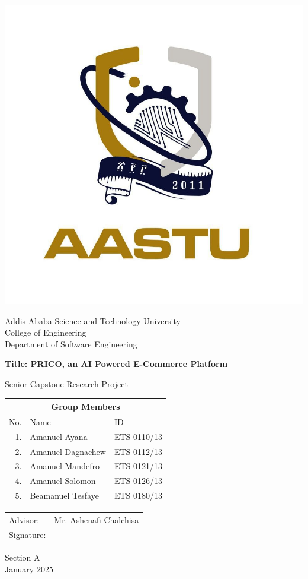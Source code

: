 \documentclass[12pt]{report}
\begin{document}
\begin{titlepage}
	\setlength{\parskip}{0pt}
	\singlespacing
	\begin{center}
		\includegraphics[width=0.4\linewidth]{aastu}

		\Large
		Addis Ababa Science and Technology University \\
		College of Engineering \\
		Department of Software Engineering

		\vspace*{1cm}

		\Large
		\textbf{Title: PRICO, an AI Powered E-Commerce Platform}

		\vspace{0.25cm}

		\Large
		Senior Capstone Research Project

		\vspace{1.25cm}

		\Large
		\begin{tabular}{ |r|l|l| }
			\hline
			\multicolumn{3}{|c|}{\textbf{Group Members}} \\
			\hline
			No. & Name              & ID                 \\
			\hline
			1.  & Amanuel Ayana     & ETS 0110/13        \\
			2.  & Amanuel Dagnachew & ETS 0112/13        \\
			3.  & Amanuel Mandefro  & ETS 0121/13        \\
			4.  & Amanuel Solomon   & ETS 0126/13        \\
			5.  & Beamanuel Tesfaye & ETS 0180/13        \\
			\hline
		\end{tabular}


		\vfill

		\Large
		\begin{tabular}{@{}p{1in}p{2.4in}@{}}
			Advisor:   & Mr. Ashenafi Chalchisa \\\cline{2-2}
			Signature: &                        \\\cline{2-2}
		\end{tabular}

		\vspace{1.25cm}
		Section A\\
		January 2025
	\end{center}
\end{titlepage}
\newpage
\end{document}
